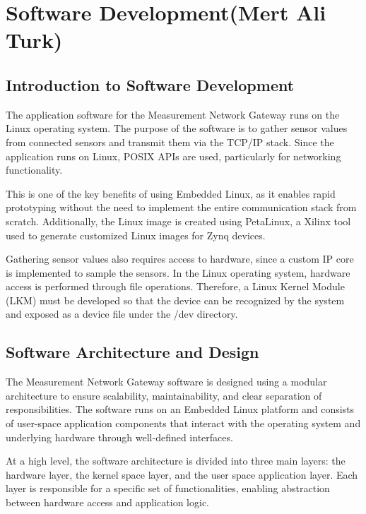 \documentclass{article}
\begin{document}
\tableofcontents
\newpage

\section{Software Development(Mert Ali Turk)}

\subsection{Introduction to Software Development}
The application software for the Measurement Network Gateway runs on the Linux operating 
system. The purpose of the software is to gather sensor values from connected sensors 
and transmit them via the TCP/IP stack. Since the application runs on Linux, POSIX APIs 
are used, particularly for networking functionality.

This is one of the key benefits of using Embedded Linux, as it enables rapid prototyping 
without the need to implement the entire communication stack from scratch. Additionally, 
the Linux image is created using PetaLinux, a Xilinx tool used to generate customized 
Linux images for Zynq devices.

Gathering sensor values also requires access to hardware, since a custom IP core 
is implemented to sample the sensors. In the Linux operating system, hardware access 
is performed through file operations. Therefore, a Linux Kernel Module (LKM) must be 
developed so that the device can be recognized by the system and exposed as a device
file under the /dev directory.

\subsection{Software Architecture and Design}

The Measurement Network Gateway software is designed using a modular architecture to ensure scalability, maintainability, and clear separation of responsibilities. The software runs on an Embedded Linux platform and consists of user-space application components that interact with the operating system and underlying hardware through well-defined interfaces.

At a high level, the software architecture is divided into three main layers: the hardware layer, the kernel space layer, and the user space application layer. Each layer is responsible for a specific set of functionalities, enabling abstraction between hardware access and application logic.
\end{document}
